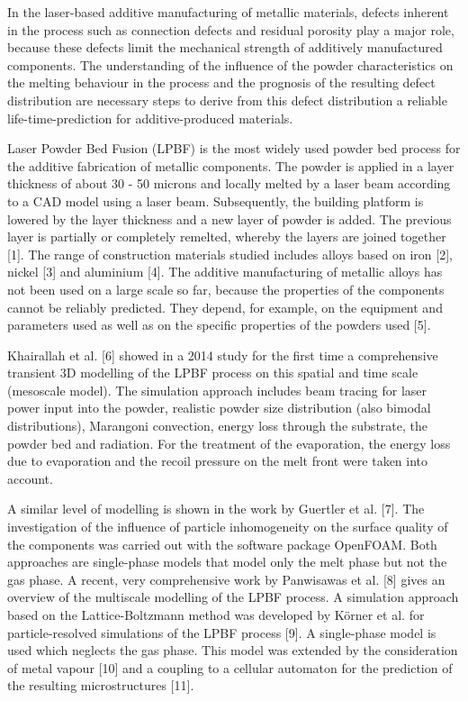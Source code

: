 \documentclass[10pt]{article}
\begin{document}
In the laser-based additive manufacturing of metallic materials, defects inherent in the process such as connection defects and residual porosity play a major role, because these defects limit the mechanical strength of additively manufactured components. The understanding of the influence of the powder characteristics on the melting behaviour in the process and the prognosis of the resulting defect distribution are necessary steps to derive from this defect distribution a reliable life-time-prediction for additive-produced materials.

Laser Powder Bed Fusion (LPBF) is the most widely used powder bed process for the additive fabrication of metallic components. The powder is applied in a layer thickness of about 30 - 50 microns and locally melted by a laser beam according to a CAD model using a laser beam. Subsequently, the building platform is lowered by the layer thickness and a new layer of powder is added. The previous layer is partially or completely remelted, whereby the layers are joined together [1]. The range of construction materials studied includes alloys based on iron [2], nickel [3] and aluminium [4]. The additive manufacturing of metallic alloys has not been used on a large scale so far, because the properties of the components cannot be reliably predicted. They depend, for example, on the equipment and parameters used as well as on the specific properties of the powders used [5].

Khairallah et al. [6] showed in a 2014 study for the first time a comprehensive transient 3D modelling of the LPBF process on this spatial and time scale (mesoscale model). The simulation approach includes beam tracing for laser power input into the powder, realistic powder size distribution (also bimodal distributions), Marangoni convection, energy loss through the substrate, the powder bed and radiation. For the treatment of the evaporation, the energy loss due to evaporation and the recoil pressure on the melt front were taken into account.

A similar level of modelling is shown in the work by Guertler et al. [7]. The investigation of the influence of particle inhomogeneity on the surface quality of the components was carried out with the software package OpenFOAM. Both approaches are single-phase models that model only the melt phase but not the gas phase. A recent, very comprehensive work by Panwisawas et al. [8] gives an overview of the multiscale modelling of the LPBF process. A simulation approach based on the Lattice-Boltzmann method was developed by Körner et al. for particle-resolved simulations of the LPBF process [9]. A single-phase model is used which neglects the gas phase. This model was extended by the consideration of metal vapour [10] and a coupling to a cellular automaton for the prediction of the resulting microstructures [11].
\end{document}
